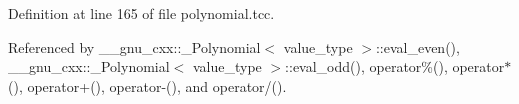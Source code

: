 Definition at line 165 of file polynomial.\+tcc.



Referenced by \+\_\+\+\_\+gnu\+\_\+cxx\+::\+\_\+\+Polynomial$<$ value\+\_\+type $>$\+::eval\+\_\+even(), \+\_\+\+\_\+gnu\+\_\+cxx\+::\+\_\+\+Polynomial$<$ value\+\_\+type $>$\+::eval\+\_\+odd(), operator\%(), operator$\ast$(), operator+(), operator-\/(), and operator/().

